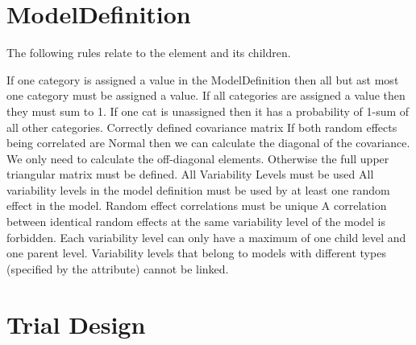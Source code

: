 \section{ModelDefinition}

The following rules relate to the  element and
its children.

\begin{valrules}
If one category is assigned a value in the ModelDefinition then all
but ast most one category must be assigned a
value.
If all categories are assigned a value then they must sum to 1. If one cat is unassigned then it has a probability of 1-sum of all
other categories.
 {Correctly defined covariance matrix} If both random
effects being correlated are Normal then we can calculate the diagonal
of the covariance. We only need to calculate the off-diagonal
elements. Otherwise the full upper triangular matrix must be defined.
 {All Variability Levels must be used} All variability
levels in the model definition must be used by at least one random
effect in the model.
 {Random effect correlations must be unique} A
correlation between identical random effects at the same variability
level of the model is forbidden.
 Each variability level can only have a maximum of one child
level and one parent level. Variability levels that belong to models
with different types (specified by the  attribute) cannot
be linked.
\end{valrules}


\section{Trial Design}

